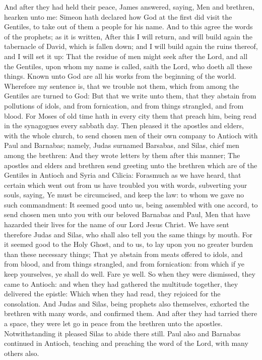  And after they had held their peace, James answered,
saying, Men and brethren, hearken unto me:  Simeon hath
declared how God at the first did visit the Gentiles, to take out of
them a people for his name.  And to this agree the words of
the prophets; as it is written,  After this I will return,
and will build again the tabernacle of David, which is fallen down; and
I will build again the ruins thereof, and I will set it up:
 That the residue of men might seek after the Lord, and all
the Gentiles, upon whom my name is called, saith the Lord, who doeth all
these things.  Known unto God are all his works from the
beginning of the world.  Wherefore my sentence is, that we
trouble not them, which from among the Gentiles are turned to God:
 But that we write unto them, that they abstain from
pollutions of idols, and from fornication, and from things strangled,
and from blood.  For Moses of old time hath in every city
them that preach him, being read in the synagogues every sabbath day.
 Then pleased it the apostles and elders, with the whole
church, to send chosen men of their own company to Antioch with Paul and
Barnabas; namely, Judas surnamed Barsabas, and Silas, chief men among
the brethren:  And they wrote letters by them after this
manner; The apostles and elders and brethren send greeting unto the
brethren which are of the Gentiles in Antioch and Syria and Cilicia:
 Forasmuch as we have heard, that certain which went out
from us have troubled you with words, subverting your souls, saying, Ye
must be circumcised, and keep the law: to whom we gave no such
commandment:  It seemed good unto us, being assembled with
one accord, to send chosen men unto you with our beloved Barnabas and
Paul,  Men that have hazarded their lives for the name of
our Lord Jesus Christ.  We have sent therefore Judas and
Silas, who shall also tell you the same things by mouth. 
For it seemed good to the Holy Ghost, and to us, to lay upon you no
greater burden than these necessary things;  That ye
abstain from meats offered to idols, and from blood, and from things
strangled, and from fornication: from which if ye keep yourselves, ye
shall do well. Fare ye well.  So when they were dismissed,
they came to Antioch: and when they had gathered the multitude together,
they delivered the epistle:  Which when they had read, they
rejoiced for the consolation.  And Judas and Silas, being
prophets also themselves, exhorted the brethren with many words, and
confirmed them.  And after they had tarried there a space,
they were let go in peace from the brethren unto the apostles.
 Notwithstanding it pleased Silas to abide there still.
 Paul also and Barnabas continued in Antioch, teaching and
preaching the word of the Lord, with many others also.

